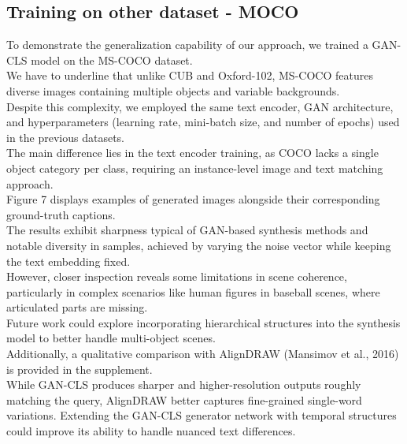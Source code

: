 \subsection*{Training on other dataset - MOCO}

To demonstrate the generalization capability of 
our approach, we trained a GAN-CLS model on the 
MS-COCO dataset. 
\\
We have to underline that unlike CUB and Oxford-102, 
MS-COCO features diverse images containing multiple 
objects and 
variable backgrounds. 
\\
Despite this complexity, we employed the same text encoder, GAN architecture, 
and hyperparameters (learning rate, mini-batch size, and number of epochs) 
used in the previous datasets. 
\\
The main difference lies in the text encoder training, as COCO lacks a single 
object category per class, requiring an instance-level image and text matching approach.
\\
Figure 7 displays examples of generated images alongside their corresponding 
ground-truth captions. 
\\
The results exhibit sharpness typical of GAN-based synthesis methods and 
notable diversity in samples, 
achieved by varying the noise vector while keeping the text embedding fixed.
\\
However, closer inspection reveals some limitations in scene coherence, 
particularly in complex scenarios like human figures in baseball scenes, 
where articulated parts are missing. 
\\
Future work could explore incorporating hierarchical structures into the 
synthesis model to better handle multi-object scenes.
\\
Additionally, a qualitative comparison with AlignDRAW (Mansimov et al., 2016) 
is provided in the supplement. 
\\
While GAN-CLS produces sharper and higher-resolution outputs roughly matching the query, 
AlignDRAW better captures fine-grained single-word variations. 
Extending the GAN-CLS generator network with temporal structures could improve
its ability to handle nuanced text differences.
